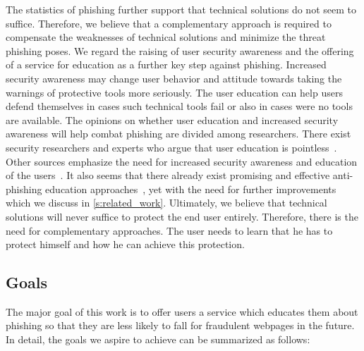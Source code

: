 The statistics of phishing further support that technical solutions do not seem to suffice.
Therefore, we believe that a complementary approach is required to compensate the weaknesses of technical solutions and minimize the threat phishing poses.
We regard the raising of user security awareness and the offering of a service for education as a further key step against phishing.
Increased security awareness may change user behavior and attitude towards taking the warnings of protective tools more seriously.
The user education can help users defend themselves in cases such technical tools fail or also in cases were no tools are available.
The opinions on whether user education and increased security awareness will help combat phishing are divided among researchers.
There exist security researchers and experts who argue that user education is pointless~\cite{useredupointless, bruceschneieronsecuritytraining}.
Other sources emphasize the need for increased security awareness and education of the users~\cite{usereducebit, usereduscmagazine}.
It also seems that there already exist promising and effective anti-phishing education approaches~\cite{kumaraguru2007protecting, sheng2007antiphishingphil}, yet with the need for further improvements which we discuss in \autoref{s:related_work}.
Ultimately, we believe that technical solutions will never suffice to protect the end user entirely.
Therefore, there is the need for complementary approaches.
The user needs to learn that he has to protect himself and how he can achieve this protection.
 
\subsection{Goals}
\label{s:goals}
The major goal of this work is to offer users a service which educates them about phishing so that they are less likely to fall for fraudulent webpages in the future.
In detail, the goals we aspire to achieve can be summarized as follows:

